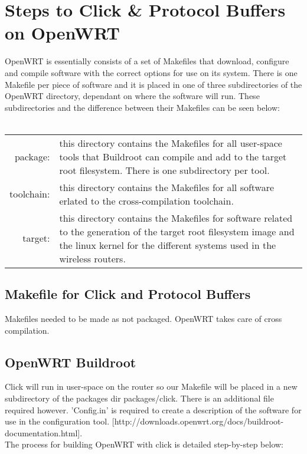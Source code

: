 
\section{Steps to Click \& Protocol Buffers on OpenWRT}

OpenWRT is essentially consists of a set of Makefiles that download, configure and compile software with the correct options for use on its system. There is one Makefile per piece of software and it is placed in one of three subdirectories of the OpenWRT directory, dependant on where the software will run. These subdirectories and the difference between their Makefiles can be seen below:\\\\

\begin{tabular}{r p{350px}}
package: &this directory contains the Makefiles for all user-space tools that Buildroot can compile and add to the target root filesystem. There is one subdirectory per tool.\\
toolchain: &this directory contains the Makefiles for all software erlated to the cross-compilation toolchain.\\
target: &this directory contains the Makefiles for software related to the generation of the target root filesystem image and the linux kernel for the different systems used in the wireless routers.\\
\end{tabular}

\subsection{Makefile for Click and Protocol Buffers}
Makefiles needed to be made as not packaged. OpenWRT takes care of cross compilation.

\subsection{OpenWRT Buildroot}

Click will run in user-space on the router so our Makefile will be placed in a new subdirectory of the packages dir packages/click. There is an additional file required however. 'Config.in' is required to create a description of the software for use in the configuration tool. [http://downloads.openwrt.org/docs/buildroot-documentation.html].\\
The process for building OpenWRT with click is detailed step-by-step below:\\

